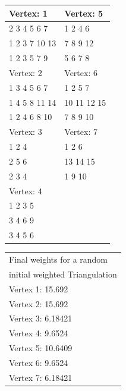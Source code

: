 \documentclass[12pt]{article}
\begin{document}
\begin{minipage}[b]{0.5\linewidth}

\begin{tabular}{|l|l|}
\hline
 Vertex: 1 &  Vertex: 5 \\
\hline
2 3 4 5 6 7  &   1 2 4 6  \\

1 2 3 7 10 13  &  7 8 9 12  \\

1 2 3 5 7 9  &   5 6 7 8  \\
\hline
 Vertex: 2 &  Vertex: 6 \\
\hline
1 3 4 5 6 7  &   1 2 5 7  \\

1 4 5 8 11 14  & 10 11 12 15  \\

1 2 4 6 8 10  &  7 8 9 10  \\
\hline
 Vertex: 3 &  Vertex: 7 \\
\hline
    1 2 4  &     1 2 6  \\

    2 5 6  &  13 14 15  \\

    2 3 4  &    1 9 10  \\
\hline
 Vertex: 4 &            \\ \hline

  1 2 3 5  &            \\

  3 4 6 9  &            \\

  3 4 5 6  &            \\ 
\hline
\end{tabular}


\end{minipage}
\begin{minipage}[b]{0.5\linewidth}

\begin{tabular}{|l|}
\hline
Final weights for a random \\

initial weighted Triangulation \\
\hline
Vertex 1: 15.692 \\

Vertex 2: 15.692 \\

Vertex 3: 6.18421 \\

Vertex 4: 9.6524 \\

Vertex 5: 10.6409 \\

Vertex 6: 9.6524 \\

Vertex 7: 6.18421 \\
\hline
\end{tabular}
\label{tab:Vres}
\end{minipage}
\end{document}
